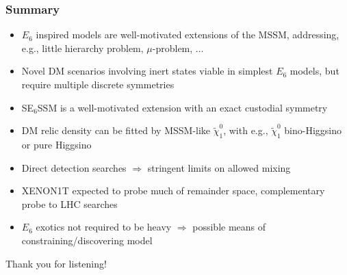 \documentclass[10pt,aspectratio=169]{beamer}
\begin{document}
\begin{frame}
  \frametitle{Summary}
  \begin{itemize} \itemsep1em
  \item $E_6$ inspired models are well-motivated extensions of the MSSM,
    addressing, e.g., little hierarchy problem, $\mu$-problem, $\ldots$
  \item Novel DM scenarios involving inert states viable in simplest $E_6$
    models, but require multiple discrete symmetries
  \item SE$_6$SSM is a well-motivated extension with an exact custodial
    symmetry
  \item DM relic density can be fitted by MSSM-like $\tilde{\chi}_1^0$, with
    e.g., $\tilde{\chi}_1^0$ bino-Higgsino or pure Higgsino
  \item Direct detection searches $\Rightarrow$ \alert{stringent limits on
    allowed mixing}
  \item XENON1T expected to probe much of remainder space, {\color{blue}
    complementary probe to LHC searches}
  \item {\color{blue} $E_6$ exotics not required to be heavy
    $\Rightarrow$ possible means of constraining/discovering model}
  \end{itemize}
  \begin{center}
    \large Thank you for listening!
  \end{center}
\end{frame}
\end{document}
